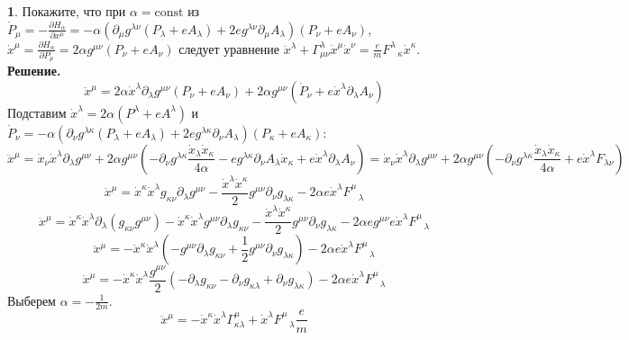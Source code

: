 \documentclass[12pt]{article}
\theoremstyle{definition}
\newtheorem{zad}{}[section]
\begin{document}
\begin{zad}
Покажите, что при $\alpha=\text{const}$ из $\dot{P}_\mu=-\frac{\partial H_\alpha}{\partial x^\mu}=-\alpha(\partial_\mu g^{\lambda\nu}(P_\lambda+eA_\lambda)+2eg^{\lambda\nu}\partial_\mu A_\lambda)(P_\nu+eA_\nu)$, $\dot{x}^\mu=\frac{\partial H_\alpha}{\partial P_\mu}=2\alpha g^{\mu\nu}(P_\nu+eA_\nu)$ следует уравнение $\ddot{x}^\lambda+\Gamma^\lambda_{\mu\nu}\dot{x}^\mu\dot{x}^\nu=\frac{e}{m}F^\lambda_{\;\;\;\kappa}\dot{x}^\kappa$.\\
\textbf{Решение.}
\begin{equation}
    \ddot{x}^\mu=2\alpha\dot{x}^\lambda\partial_\lambda g^{\mu\nu}(P_\nu+eA_\nu)+2\alpha g^{\mu\nu}(\dot{P}_\nu+e\dot{x}^\lambda\partial_\lambda A_\nu)
\end{equation}
Подставим $\dot{x}^\lambda=2\alpha(P^\lambda+eA^\lambda)$ и $\dot{P}_\nu=-\alpha(\partial_\nu g^{\lambda\kappa}(P_\lambda+eA_\lambda)+2eg^{\lambda\kappa}\partial_\nu A_\lambda)(P_\kappa+eA_\kappa)$:
\begin{equation}
    \ddot{x}^\mu=\dot{x}_\nu\dot{x}^\lambda\partial_\lambda g^{\mu\nu}+2\alpha g^{\mu\nu}(-\partial_\nu g^{\lambda\kappa}\frac{\dot{x}_\lambda\dot{x}_\kappa}{4\alpha}-eg^{\lambda\kappa}\partial_\nu A_\lambda\dot{x}_\kappa+e\dot{x}^\lambda\partial_\lambda A_\nu)=\dot{x}_\nu\dot{x}^\lambda\partial_\lambda g^{\mu\nu}+2\alpha g^{\mu\nu}(-\partial_\nu g^{\lambda\kappa}\frac{\dot{x}_\lambda\dot{x}_\kappa}{4\alpha}+e\dot{x}^\lambda F_{\lambda\nu})
\end{equation}
\begin{equation}
    \ddot{x}^\mu=\dot{x}^\kappa\dot{x}^\lambda g_{\kappa\nu}\partial_\lambda g^{\mu\nu}-\frac{\dot{x}^\lambda\dot{x}^\kappa}{2}g^{\mu\nu}\partial_\nu g_{\lambda\kappa}-2\alpha e\dot{x}^\lambda F^\mu_{\;\;\;\lambda}
\end{equation}
\begin{equation}
    \ddot{x}^\mu=\dot{x}^\kappa\dot{x}^\lambda \partial_\lambda (g_{\kappa\nu}g^{\mu\nu})-\dot{x}^\kappa\dot{x}^\lambda g^{\mu\nu}\partial_\lambda g_{\kappa\nu}-\frac{\dot{x}^\lambda\dot{x}^\kappa}{2}g^{\mu\nu}\partial_\nu g_{\lambda\kappa}-2\alpha eg^{\mu\nu}e\dot{x}^\lambda F^\mu_{\;\;\;\lambda}
\end{equation}
\begin{equation}
    \ddot{x}^\mu=-\dot{x}^\kappa\dot{x}^\lambda (-g^{\mu\nu}\partial_\lambda g_{\kappa\nu}+\frac{1}{2}g^{\mu\nu}\partial_\nu g_{\lambda\kappa})-2\alpha e \dot{x}^\lambda F^\mu_{\;\;\;\lambda}
\end{equation}
\begin{equation}
    \ddot{x}^\mu=-\dot{x}^\kappa\dot{x}^\lambda\frac{g^{\mu\nu}}{2}(-\partial_\lambda g_{\kappa\nu}-\partial_\nu g_{\kappa\lambda}+\partial_\nu g_{\lambda\kappa})-2\alpha e\dot{x}^\lambda F^\mu_{\;\;\;\lambda}
\end{equation}
Выберем $\alpha=-\frac{1}{2m}$.
\begin{equation}
    \boxed{\ddot{x}^\mu=-\dot{x}^\kappa\dot{x}^\lambda\Gamma^\mu_{\kappa\lambda}+ \dot{x}^\lambda F^\mu_{\;\;\;\lambda}\frac{e}{m}}
\end{equation}
\end{zad}
\end{document}
